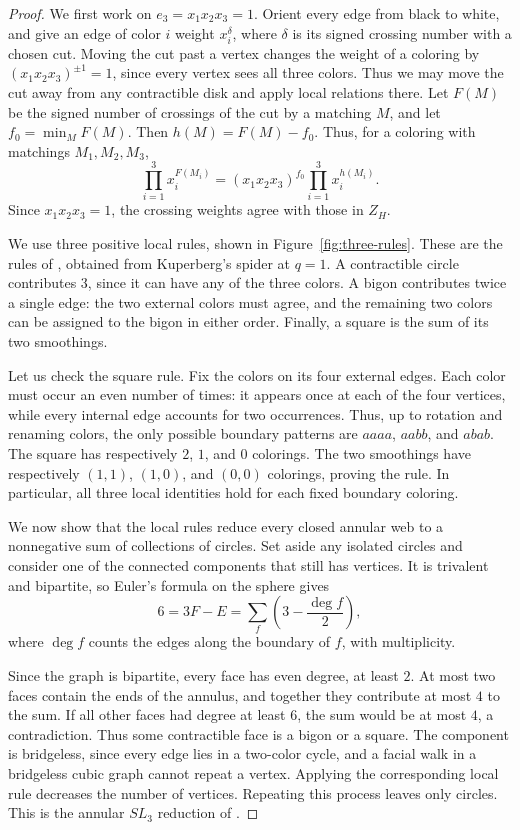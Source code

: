 \documentclass[11pt]{article}
\theoremstyle{definition}
\theoremstyle{remark}
\begin{document}
\begin{proof}
We first work on $e_3=x_1x_2x_3=1$.
Orient every edge from black to white, and give
an edge of color $i$ weight $x_i^\delta$, where
$\delta$ is its signed crossing number with a
chosen cut. Moving the cut past a vertex changes
the weight of a coloring by
$(x_1x_2x_3)^{\pm1}=1$, since every vertex sees
all three colors. Thus we may move the cut away
from any contractible disk and apply local
relations there. 
Let $F(M)$ be the signed number of crossings of
the cut by a matching $M$, and let
$f_0=\min_M F(M)$. Then $h(M)=F(M)-f_0$.
Thus, for a coloring with matchings $M_1,M_2,M_3$,
\[
\prod_{i=1}^3 x_i^{F(M_i)}
=(x_1x_2x_3)^{f_0}
\prod_{i=1}^3 x_i^{h(M_i)}.
\]
Since $x_1x_2x_3=1$, the crossing weights
agree with those in $Z_H$.


We use three positive local rules, shown in
Figure~\ref{fig:three-rules}. These are the
rules of \cite[Figure~1 and Remark~2.1]{PWeb},
obtained from Kuperberg's spider \cite{Kuperberg}
at $q=1$. A contractible circle contributes $3$,
since it can have any of the three colors.
A bigon contributes twice a single edge:
the two external colors must agree, and the
remaining two colors can be assigned to the
bigon in either order. Finally, a square is
the sum of its two smoothings.

Let us check the square rule. Fix the colors
on its four external edges. Each color must
occur an even number of times: it appears once
at each of the four vertices, while every
internal edge accounts for two occurrences.
Thus, up to rotation and renaming colors,
the only possible boundary patterns are
$aaaa$, $aabb$, and $abab$.
The square has respectively $2$, $1$, and $0$
colorings. The two smoothings have respectively
$(1,1)$, $(1,0)$, and $(0,0)$ colorings,
proving the rule. In particular, all three
local identities hold for each fixed boundary
coloring.



We now show that the local rules reduce every closed
annular web to a nonnegative sum of collections of
circles. Set aside any isolated circles and consider one of the connected components that still has vertices.
It is trivalent and bipartite, so Euler's formula
on the sphere gives
\[
6=3F-E
=\sum_f\left(3-\frac{\deg f}{2}\right),
\]
where $\deg f$ counts the edges along the boundary
of $f$, with multiplicity.

Since the graph is bipartite, every face has even
degree, at least $2$. At most two faces contain
the ends of the annulus, and together they contribute
at most $4$ to the sum. If all other faces had
degree at least $6$, the sum would be at most $4$,
a contradiction. Thus some contractible face is
a bigon or a square. The component is bridgeless, since every edge lies in
a two-color cycle, and a facial walk in a bridgeless
cubic graph cannot repeat a vertex. Applying the corresponding
local rule decreases the number of vertices.
Repeating this process leaves only circles.
This is the annular $SL_3$ reduction of
\cite[Proposition~6.1]{DKS}.


\end{proof}
\end{document}
